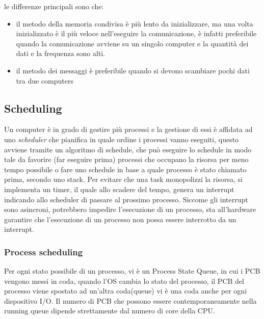 \documentclass{article}
\begin{document}
            le differenze principali sono che:
            \begin{itemize}
                \item il metodo della memoria condivisa è più lento da inizializzare, ma una volta inizializzato è il più veloce nell'eseguire la comunicazione, è infatti preferibile quando la comunicazione avviene su un singolo computer e la quantità dei dati e la frequenza sono alti.
                \item il metodo dei messaggi è preferibile quando si devono scambiare pochi dati tra due computers
            \end{itemize}
    \subsection{Scheduling}

        Un computer è in grado di gestire più processi e la gestione di essi è affidata ad uno \textit{scheduler} che pianifica in quale ordine i processi vanno eseguiti, questo avviene tramite un algoritmo di schedule, che può eseguire lo schedule in modo tale da favorire (far eseguire prima) processi che occupano la risorsa per meno tempo possibile o fare uno schedule in base a quale processo è stato chiamato prima, secondo uno stack.
        Per evitare che una task monopolizzi la risorsa, si implementa un timer, il quale allo scadere del tempo, genera un interrupt indicando allo scheduler di passare al prossimo processo.
        Siccome gli interrupt sono asincroni, potrebbero impedire l'esecuzione di un processo, sta all'hardware garantire che l'esecuzione di un processo non possa essere interrotto da un interrupt.

        \subsubsection{Process scheduling}

        Per ogni stato possibile di un processo, vi è un Process State Queue, in cui i PCB vengono messi in coda, quando l'OS cambia lo stato del processo, il PCB del processo viene spostato ad un'altra coda(queue) vi è una coda anche per ogni dispositivo I/O.
        Il numero di PCB che possono essere contemporaneamente nella running queue dipende strettamente dal numero di core della CPU.
        
\end{document}
